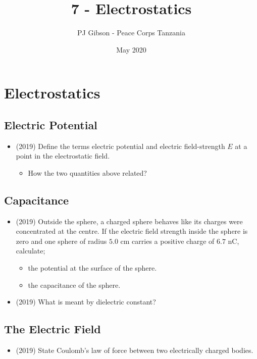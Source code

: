 \documentclass{article}
\title{7 - Electrostatics}
\author{PJ Gibson - Peace Corps Tanzania}
\date{May 2020}
\begin{document}
\maketitle


\section{Electrostatics}

\subsection{Electric Potential}
\begin{itemize}
\item (2019)  Define the terms electric potential and electric field-strength $ E$ at a point in the electrostatic field.
 \begin{itemize}
\item How the two quantities above related? 
\end{itemize}
\end{itemize}

\subsection{Capacitance}
\begin{itemize}
\item (2019)  Outside the sphere, a charged sphere behaves like its charges were concentrated at the centre. If the electric field strength inside the sphere is zero and one sphere of radius $ 5.0$ cm carries a positive charge of $ 6.7$ nC, calculate; 
 \begin{itemize}
\item the potential at the surface of the sphere. 
\item the capacitance of the sphere. 
\end{itemize}
\item (2019)  What is meant by dielectric constant? 
\end{itemize}

\subsection{The Electric Field}
\begin{itemize}
\item (2019)  State Coulomb’s law of force between two electrically charged bodies. 
\end{itemize}
\end{document}
